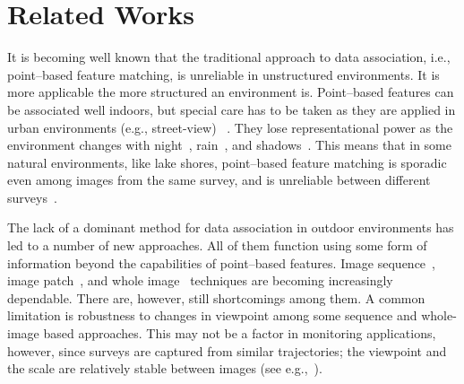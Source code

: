 \section{Related Works}


It is becoming well known that the traditional approach to data association, i.e., point--based feature matching, is unreliable in unstructured environments. It is more applicable the more structured an environment is. Point--based features can be associated well indoors, but special care has to be taken as they are applied in urban environments (e.g., street-view) ~\cite{beall2014, stumm2013}. They lose representational power as the environment changes with night~\cite{nelson2015}, rain~\cite{cord2014}, and shadows~\cite{corke2013}. This means that in some natural environments, like lake shores, point--based feature matching is sporadic even among images from the same survey, and is unreliable between different surveys~\cite{griffith2014iser}. 

The lack of a dominant method for data association in outdoor environments has led to a number of new approaches. All of them function using some form of information beyond the capabilities of point--based features. Image sequence~\cite{milford2012seqslam, cummins2008fab, milford2004, churchill2013, naseer2015}, image patch~\cite{mcmanus2014, Sunderhauf2015a}, and whole image~\cite{arroyo2015, neubert2015superpixel} techniques are becoming increasingly dependable. There are, however, still shortcomings among them. A common limitation is robustness to changes in viewpoint among some sequence and whole-image based approaches. This may not be a factor in monitoring applications, however, since surveys are captured from similar trajectories; the viewpoint and the scale are relatively stable between images (see e.g.,~\cite{milford2014}).

